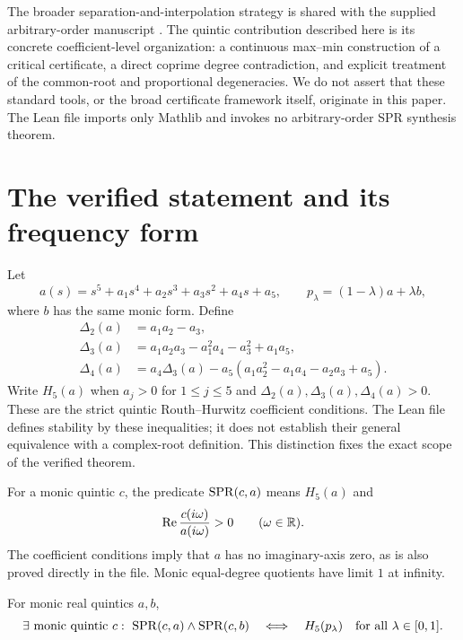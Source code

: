 \documentclass[11pt]{article}
\begin{document}
The broader separation-and-interpolation strategy is shared with the supplied arbitrary-order manuscript \cite{referenceDraft}. The quintic contribution described here is its concrete coefficient-level organization: a continuous max--min construction of a critical certificate, a direct coprime degree contradiction, and explicit treatment of the common-root and proportional degeneracies. We do not assert that these standard tools, or the broad certificate framework itself, originate in this paper. The Lean file imports only Mathlib and invokes no arbitrary-order SPR synthesis theorem.

\section{The verified statement and its frequency form}
Let
\[
 a(s)=s^5+a_1s^4+a_2s^3+a_3s^2+a_4s+a_5,
 \qquad p_\lambda=(1-\lambda)a+\lambda b,
\]
where $b$ has the same monic form. Define
\begin{align}
 \Delta_2(a)&=a_1a_2-a_3,\\
 \Delta_3(a)&=a_1a_2a_3-a_1^2a_4-a_3^2+a_1a_5,\\
 \Delta_4(a)&=a_4\Delta_3(a)
 -a_5(a_1a_2^2-a_1a_4-a_2a_3+a_5).
\end{align}
Write $H_5(a)$ when $a_j>0$ for $1\le j\le5$ and $\Delta_2(a),\Delta_3(a),\Delta_4(a)>0$. These are the strict quintic Routh--Hurwitz coefficient conditions. The Lean file defines stability by these inequalities; it does not establish their general equivalence with a complex-root definition. This distinction fixes the exact scope of the verified theorem.

For a monic quintic $c$, the predicate $\mathrm{SPR}(c,a)$ means $H_5(a)$ and
\[
 \operatorname{Re}\frac{c(i\omega)}{a(i\omega)}>0\qquad(\omega\in\mathbb R).
\]
The coefficient conditions imply that $a$ has no imaginary-axis zero, as is also proved directly in the file. Monic equal-degree quotients have limit $1$ at infinity.

\begin{theorem}\label{thm:main}
For monic real quintics $a,b$,
\begin{equation}
 \exists\text{ monic quintic }c:\ \SPR(c,a)\land\SPR(c,b)
 \quad\Longleftrightarrow\quad
 H_5(p_\lambda)\quad\text{for all }\lambda\in[0,1].
\end{equation}
\end{theorem}
\end{document}
